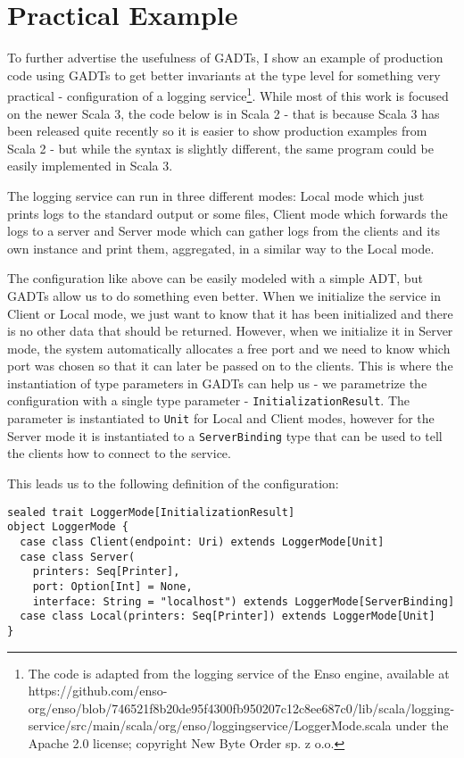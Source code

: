 \section{Practical Example}

To further advertise the usefulness of GADTs, I show an example of production code using GADTs to get better invariants at the type level for something very practical - configuration of a logging service\footnote{The code is adapted from the logging service of the Enso engine, available at https://github.com/enso-org/enso/blob/746521f8b20de95f4300fb950207c12c8ee687c0/lib/scala/logging-service/src/main/scala/org/enso/loggingservice/LoggerMode.scala under the Apache 2.0 license; copyright New Byte Order sp. z o.o.}. While most of this work is focused on the newer Scala 3, the code below is in Scala 2 - that is because Scala 3 has been released quite recently so it is easier to show production examples from Scala 2 - but while the syntax is slightly different, the same program could be easily implemented in Scala 3.

The logging service can run in three different modes: Local mode which just prints logs to the standard output or some files, Client mode which forwards the logs to a server and Server mode which can gather logs from the clients and its own instance and print them, aggregated, in a similar way to the Local mode.

The configuration like above can be easily modeled with a simple ADT, but GADTs allow us to do something even better. When we initialize the service in Client or Local mode, we just want to know that it has been initialized and there is no other data that should be returned. However, when we initialize it in Server mode, the system automatically allocates a free port and we need to know which port was chosen so that it can later be passed on to the clients. This is where the instantiation of type parameters in GADTs can help us - we parametrize the configuration with a single type parameter - \texttt{InitializationResult}. The parameter is instantiated to \texttt{Unit} for Local and Client modes, however for the Server mode it is instantiated to a \texttt{ServerBinding} type that can be used to tell the clients how to connect to the service.

This leads us to the following definition of the configuration:

\begin{verbatim}
sealed trait LoggerMode[InitializationResult]
object LoggerMode {
  case class Client(endpoint: Uri) extends LoggerMode[Unit]
  case class Server(
    printers: Seq[Printer], 
    port: Option[Int] = None, 
    interface: String = "localhost") extends LoggerMode[ServerBinding]
  case class Local(printers: Seq[Printer]) extends LoggerMode[Unit]
}
\end{verbatim}

